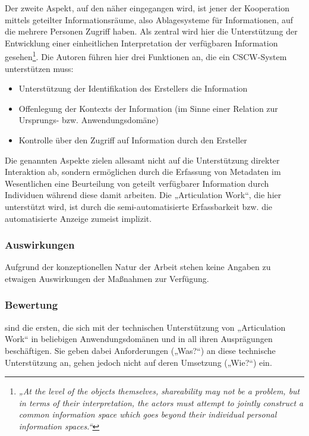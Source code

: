Der zweite Aspekt, auf den näher eingegangen wird, ist jener der Kooperation mittels geteilter Informationsräume, also Ablagesysteme für Informationen, auf die mehrere Personen Zugriff haben. Als zentral wird hier die Unterstützung der Entwicklung einer einheitlichen Interpretation der verfügbaren Information gesehen\footnote{\emph{„At the level of the objects themselves, shareability may not be a problem, but in terms of their interpretation, the actors must attempt to jointly construct a common information space which goes beyond their individual personal information spaces.“}\citep[][S. 21]{Schmidt92}}. Die Autoren führen hier drei Funktionen an, die ein \gls{CSCW}-System unterstützen muss:
\begin{itemize}
	\item Unterstützung der Identifikation des Erstellers die Information
	\item Offenlegung der Kontexts der Information (im Sinne einer Relation zur Ursprungs- bzw. Anwendungsdomäne)
	\item Kontrolle über den Zugriff auf Information durch den Ersteller
\end{itemize}
Die genannten Aspekte zielen allesamt nicht auf die Unterstützung direkter Interaktion ab, sondern ermöglichen durch die Erfassung von Metadaten im Wesentlichen eine Beurteilung von geteilt verfügbarer Information durch Individuen während diese damit arbeiten. Die „Articulation Work“, die hier unterstützt wird, ist durch die semi-automatisierte Erfassbarkeit bzw. die automatisierte Anzeige zumeist implizit. 

\subsubsection{Auswirkungen}

Aufgrund der konzeptionellen Natur der Arbeit stehen keine Angaben zu etwaigen Auswirkungen der Maßnahmen zur Verfügung.

\subsubsection{Bewertung}

\citet{Schmidt92} sind die ersten, die sich mit der technischen Unterstützung von „Articulation Work“ in beliebigen Anwendungsdomänen und in all ihren Ausprägungen beschäftigen. Sie geben dabei Anforderungen („Was?“) an diese technische Unterstützung an, gehen jedoch nicht auf deren Umsetzung („Wie?“) ein.

